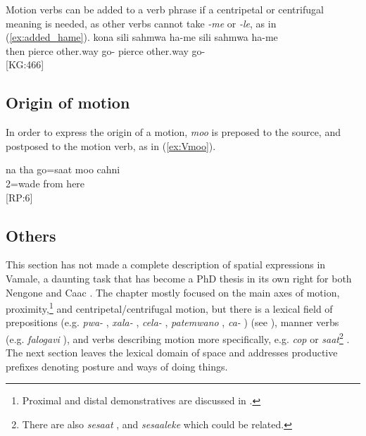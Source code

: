 Motion verbs can be added to a verb phrase if a centripetal or centrifugal meaning is needed, as other verbs cannot take \textit{-me} or \textit{-le}, as in (\ref{ex:added_hame}).
\ea \label{ex:added_hame}\gll kona sili sahmwa ha-me sili sahmwa ha-me\\ then pierce other.way go- pierce other.way go-\\
\glt {} {[KG:466]}
\z


\subsection{Origin of motion}
\label{ssec:mo_ko}
In order to express the origin of a motion, \textit{moo}  is preposed to the source, and postposed to the motion verb, as in (\ref{ex:Vmoo}).

\ea \label{ex:Vmoo}\gll na tha go=saat moo cahni\\
   2=wade from here \\
\glt {} {[RP:6]}
\z

\subsection{Others}

This section has not made a complete description of spatial expressions in Vamale, a daunting task that has become a PhD thesis in its own right for both Nengone \parencite{bearune_lexpression_2012} and Caac \parencite{cauchard_study_2014}. The chapter mostly focused on the main axes of motion, proximity,\footnote{Proximal and distal demonstratives are discussed in .} and centripetal/centrifugal motion, but there is a lexical field of prepositions (e.g. \textit{pwa-} , \textit{xala-} , \textit{cela-} , \textit{patemwano} , \textit{ca-} ) (see ), manner verbs (e.g. \textit{falogavi} ), and verbs describing motion more specifically, e.g. \textit{cop}  or \textit{saat}\footnote{There are also \textit{sesaat} , and \textit{sesaaleke}  which could be related.} . The next section leaves the lexical domain of space and addresses productive prefixes denoting posture and ways of doing things.


